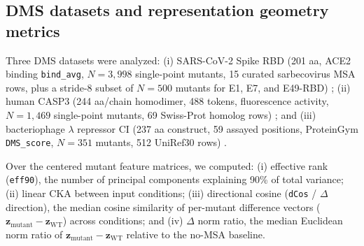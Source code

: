 \documentclass[10pt,a4paper]{article}
\begin{document}
\subsection{DMS datasets and representation geometry metrics}
Three DMS datasets were analyzed: (i) SARS-CoV-2 Spike RBD (201 aa, ACE2 binding \texttt{bind\_avg}, $N=3,998$ single-point mutants, 15 curated sarbecovirus MSA rows, plus a stride-8 subset of $N=500$ mutants for E1, E7, and E49-RBD) \citep{starr2020deep}; (ii) human CASP3 (244 aa/chain homodimer, 488 tokens, fluorescence activity, $N=1,469$ single-point mutants, 69 Swiss-Prot homolog rows) \citep{roychowdhury2022microfluidic}; and (iii) bacteriophage $\lambda$ repressor CI (237 aa construct, 59 assayed positions, ProteinGym \texttt{DMS\_score}, $N=351$ mutants, 512 UniRef30 rows) \citep{notin2023proteingym}.

Over the centered mutant feature matrices, we computed: (i) effective rank (\texttt{eff90}), the number of principal components explaining 90\% of total variance; (ii) linear CKA \citep{kornblith2019similarity} between input conditions; (iii) directional cosine (\texttt{dCos} / $\Delta$ direction), the median cosine similarity of per-mutant difference vectors ($\mathbf{z}_{\mathrm{mutant}} - \mathbf{z}_{\mathrm{WT}}$) across conditions; and (iv) $\Delta$ norm ratio, the median Euclidean norm ratio of $\mathbf{z}_{\mathrm{mutant}} - \mathbf{z}_{\mathrm{WT}}$ relative to the no-MSA baseline.
\end{document}
